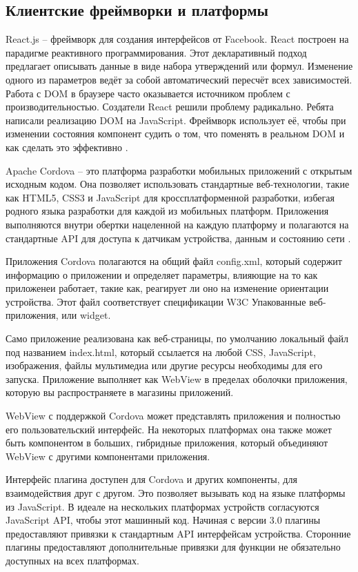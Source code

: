 
\subsection{Клиентские фреймворки и платформы}
\label{sub:domain:other_algos}
React.js -- фреймворк для создания интерфейсов от Facebook. React построен на парадигме реактивного программирования. Этот декларативный подход предлагает описывать данные в виде набора утверждений или формул. Изменение одного из параметров ведёт за собой автоматический пересчёт всех зависимостей. Работа с DOM в браузере часто оказывается источником проблем с производительностью. Создатели React решили проблему радикально. Ребята написали реализацию DOM на JavaScript. Фреймворк использует её, чтобы при изменении состояния компонент судить о том, что поменять в реальном DOM и как сделать это эффективно \cite{react_js}.

Apache Cordova -- это платформа разработки мобильных приложений с открытым исходным кодом. Она позволяет использовать стандартные веб-технологии, такие как HTML5, CSS3 и JavaScript для кроссплатформенной разработки, избегая родного языка разработки для каждой из мобильных платформ. Приложения выполняются внутри обертки нацеленной на каждую платформу и полагаются на стандартные API для доступа к датчикам устройства, данным и состоянию сети \cite{cordova}.

Приложения Cordova полагаются на общий файл config.xml, который содержит информацию о приложении и определяет параметры, влияющие на то как приложенеи работает, такие как, реагирует ли оно на изменение ориентации устройства. Этот файл соответствует спецификации W3C Упакованные веб-приложения, или widget.

Само приложение реализована как веб-страницы, по умолчанию локальный файл под названием index.html, который ссылается на любой CSS, JavaScript, изображения, файлы мультимедиа или другие ресурсы необходимы для его запуска. Приложение выполняет как WebView в пределах оболочки приложения, которую вы распространяете в магазины приложений.

WebView с поддержкой Cordova может представлять приложения и полностью его пользовательский интерфейс. На некоторых платформах она также может быть компонентом в больших, гибридные приложения, который объединяют WebView с другими компонентами приложения.

Интерфейс плагина доступен для Cordova и других компоненты, для взаимодействия друг с другом. Это позволяет вызывать код на языке платформы из JavaScript. В идеале на нескольких платформах устройств согласуются JavaScript API, чтобы этот машинный код. Начиная с версии 3.0 плагины предоставляют привязки к стандартным API интерфейсам устройства. Сторонние плагины предоставляют дополнительные привязки для функции не обязательно доступных на всех платформах.

